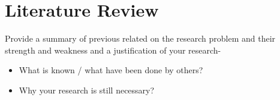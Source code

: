 \section*{Literature Review}
\label{sec:literaturereview}

Provide a summary of previous related on the research problem and their 
strength and weakness and a justification of your research-
\begin{itemize}
	\item What is known / what have been done by others? 
	\cite{khan2005prevalence}
	\item Why your research is still necessary? \cite{merrill2012high}
\end{itemize}


